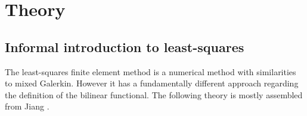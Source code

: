 
\chapter{Theory} %

\label{chap:theory} %



\section{Informal introduction to least-squares}
The least-squares finite element method is a numerical method with similarities to mixed Galerkin. However it has a fundamentally different approach regarding the definition of the bilinear functional. The following theory is mostly assembled from Jiang \cite{Jiang}. 


